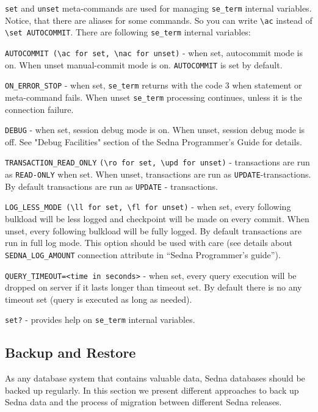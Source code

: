 \documentclass[a4paper,12pt]{article}
\begin{document}
\verb!set! and \verb!unset! meta-commands are used for managing \verb!se_term!
internal variables. Notice, that there are aliases for some commands. So you can
write \verb!\ac! instead of \verb!\set AUTOCOMMIT!. There are following
\verb!se_term! internal variables:

\verb!AUTOCOMMIT (\ac for set, \nac for unset)! - when set, autocommit mode is
on. When unset manual-commit mode is on. \verb!AUTOCOMMIT! is set by default.

\verb!ON_ERROR_STOP! - when set, \verb!se_term! returns with the code 3 when
statement or meta-command fails. When unset \verb!se_term! processing continues,
unless it is the connection failure.

\verb!DEBUG! - when set, session debug mode is on. When unset, session debug
mode is off. See "Debug Facilities" section of the Sedna Programmer's Guide for
details.

\verb!TRANSACTION_READ_ONLY! \verb!(\ro for set, \upd for unset)! - transactions
are run as \verb!READ-ONLY! when set. When unset, transactions are run as
\verb!UPDATE!-transactions. By default transactions are run as \verb!UPDATE! -
transactions.

\verb!LOG_LESS_MODE (\ll for set, \fl for unset)! - when set, every following
bulkload will be less logged and checkpoint will be made on every commit. When
unset, every following bulkload will be fully logged. By default transactions
are run in full log mode. This option should be used with care (see details
about \verb!SEDNA_LOG_AMOUNT! connection attribute in ``Sedna Programmer's
guide'').

\verb!QUERY_TIMEOUT=<time in seconds>! - when set, every query execution will be
dropped on server if it lasts longer than timeout set. By default there is no
any timeout set (query is executed as long as needed).

\verb!set?! - provides help on \verb!se_term! internal variables.


\subsection{Backup and Restore}

As any database system that contains valuable data, Sedna databases should be
backed up regularly. In this section we present different approaches to back up
Sedna data and the process of migration between different Sedna releases.
\end{document}
